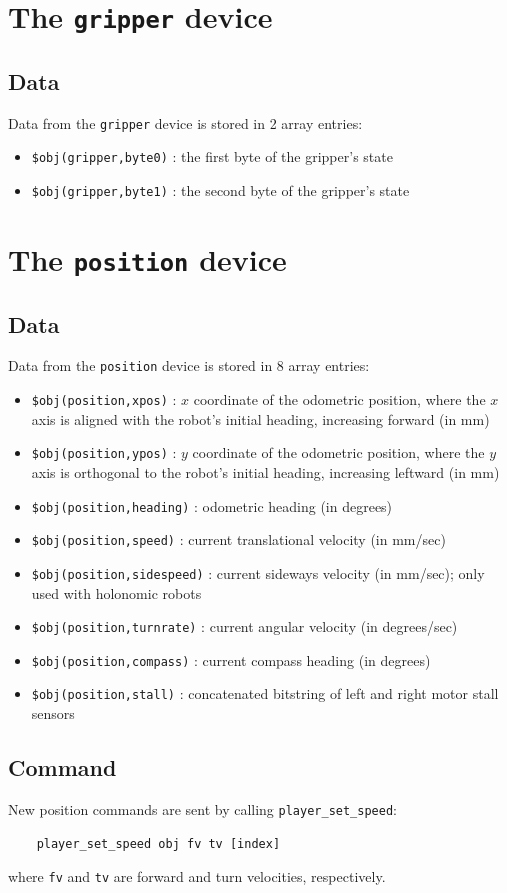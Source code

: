 \documentclass[11pt]{article}
\begin{document}
\section{The {\tt gripper} device}
\subsection{Data}
Data from the {\tt gripper} device is stored in 2 array entries:
\begin{itemize}
\item {\tt \$obj(gripper,byte0)} : the first byte of the gripper's state
\item {\tt \$obj(gripper,byte1)} : the second byte of the gripper's state
\end{itemize}

\section{The {\tt position} device}
\subsection{Data}
Data from the {\tt position} device is stored in 8 array entries:
\begin{itemize}
\item {\tt \$obj(position,xpos)} : $x$ coordinate of the odometric
position, where the $x$ axis is aligned with the robot's initial heading,
increasing forward (in mm)
\item {\tt \$obj(position,ypos)} : $y$ coordinate of the odometric
position, where the $y$ axis is orthogonal to the robot's initial heading,
increasing leftward (in mm)
\item {\tt \$obj(position,heading)} : odometric heading (in
degrees)
\item {\tt \$obj(position,speed)} : current translational velocity (in
mm/sec)
\item {\tt \$obj(position,sidespeed)} : current sideways velocity (in
mm/sec); only used with holonomic robots
\item {\tt \$obj(position,turnrate)} : current angular velocity (in
degrees/sec)
\item {\tt \$obj(position,compass)} : current compass heading (in degrees)
\item {\tt \$obj(position,stall)} : concatenated bitstring of left and right
motor stall sensors
\end{itemize}

\subsection{Command}
New position commands are sent by calling {\tt player\_set\_speed}:
\begin{verbatim}
    player_set_speed obj fv tv [index]
\end{verbatim}
where {\tt fv} and {\tt tv} are forward and turn velocities, respectively.
\end{document}

